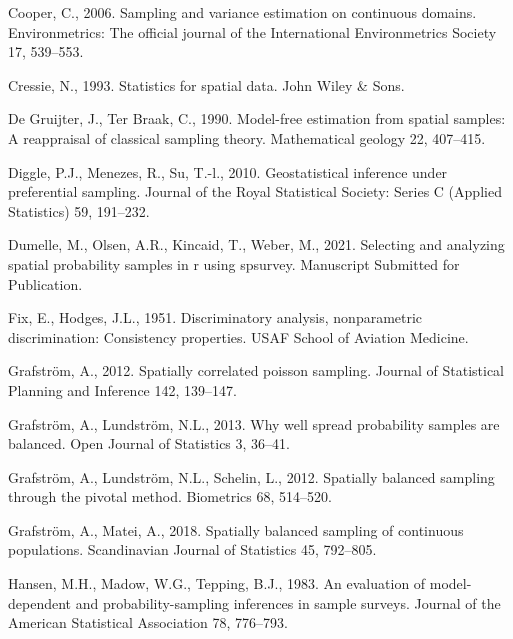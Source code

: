 \documentclass[]{elsarticle} %
\begin{document}
\leavevmode\hypertarget{ref-cooper2006sampling}{}%
Cooper, C., 2006. Sampling and variance estimation on continuous
domains. Environmetrics: The official journal of the International
Environmetrics Society 17, 539--553.

\leavevmode\hypertarget{ref-cressie1993statistics}{}%
Cressie, N., 1993. Statistics for spatial data. John Wiley \& Sons.

\leavevmode\hypertarget{ref-de1990model}{}%
De Gruijter, J., Ter Braak, C., 1990. Model-free estimation from spatial
samples: A reappraisal of classical sampling theory. Mathematical
geology 22, 407--415.

\leavevmode\hypertarget{ref-diggle2010geostatistical}{}%
Diggle, P.J., Menezes, R., Su, T.-l., 2010. Geostatistical inference
under preferential sampling. Journal of the Royal Statistical Society:
Series C (Applied Statistics) 59, 191--232.

\leavevmode\hypertarget{ref-dumelle2021spsurvey}{}%
Dumelle, M., Olsen, A.R., Kincaid, T., Weber, M., 2021. Selecting and
analyzing spatial probability samples in r using spsurvey. Manuscript
Submitted for Publication.

\leavevmode\hypertarget{ref-fix1951discriminatory}{}%
Fix, E., Hodges, J.L., 1951. Discriminatory analysis, nonparametric
discrimination: Consistency properties. USAF School of Aviation
Medicine.

\leavevmode\hypertarget{ref-grafstrom2012spatiallypoisson}{}%
Grafström, A., 2012. Spatially correlated poisson sampling. Journal of
Statistical Planning and Inference 142, 139--147.

\leavevmode\hypertarget{ref-grafstrom2013well}{}%
Grafström, A., Lundström, N.L., 2013. Why well spread probability
samples are balanced. Open Journal of Statistics 3, 36--41.

\leavevmode\hypertarget{ref-grafstrom2012spatially}{}%
Grafström, A., Lundström, N.L., Schelin, L., 2012. Spatially balanced
sampling through the pivotal method. Biometrics 68, 514--520.

\leavevmode\hypertarget{ref-grafstrom2018spatially}{}%
Grafström, A., Matei, A., 2018. Spatially balanced sampling of
continuous populations. Scandinavian Journal of Statistics 45, 792--805.

\leavevmode\hypertarget{ref-hansen1983evaluation}{}%
Hansen, M.H., Madow, W.G., Tepping, B.J., 1983. An evaluation of
model-dependent and probability-sampling inferences in sample surveys.
Journal of the American Statistical Association 78, 776--793.
\end{document}
